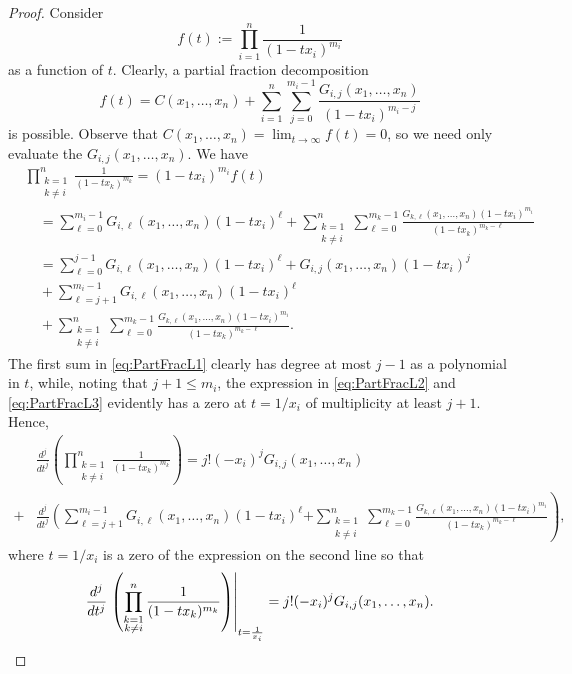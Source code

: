 \documentclass{amsart}
\theoremstyle{definition}
\theoremstyle{remark}
\begin{document}
\begin{proof}
Consider
\[
    f(t)    :=  \prod\limits_{i=1}^n \frac{1}{(1 - t x_i)^{m_i} }
\]
as a function of $t$. Clearly, a partial fraction decomposition
\[
    f(t)    =   C(x_1,\ldots,x_n)
                    + \sum\limits_{i=1}^n \sum\limits_{j=0}^{m_i-1}
                        \frac{ G_{i,j}(x_1,\ldots,x_n) }{(1 - t x_i)^{m_i - j} }
\]
is possible. Observe that $C(x_1,\ldots,x_n) = \lim_{t\to\infty} f(t) = 0$, so we need only evaluate the
$G_{i,j}(x_1,\ldots,x_n)$. We have
\begin{align}
    \nonumber
    &\prod\limits_{\substack{k=1 \\ k\neq i}}^n \frac{1}{(1 - t x_k)^{m_k}}
        =      (1 - t x_i)^{m_i} f(t)
    \\ \nonumber &\quad
    = \sum\limits_{\ell=0}^{m_i-1} G_{i,\ell}(x_1,\ldots,x_n)(1 - t x_i)^\ell
            + \sum\limits_{\substack{k=1 \\ k\neq i}}^n \sum\limits_{\ell=0}^{m_k-1}
                \frac{G_{k,\ell}(x_1,\ldots,x_n) (1 - t x_i)^{m_i}}
                    {(1 - t x_k)^{m_k-\ell}}
    \\ \label{eq:PartFracL1}
    &\quad=      \sum\limits_{\ell=0}^{j-1} G_{i,\ell}(x_1,\ldots,x_n)(1 - t x_i)^\ell
                + G_{i,j}(x_1,\ldots,x_n)(1 - t x_i)^j
    \\ \label{eq:PartFracL2}
    &\quad
                + \sum\limits_{\ell=j+1}^{m_i-1} G_{i,\ell}(x_1,\ldots,x_n)(1 - t x_i)^\ell
    \\ \label{eq:PartFracL3}
    &\quad
                + \sum\limits_{\substack{k=1\\k\neq i}}^n \sum\limits_{\ell=0}^{m_k-1}
                    \frac{G_{k,\ell}(x_1,\ldots,x_n) (1 - t x_i)^{m_i} }
                        {(1 - t x_k)^{m_k-\ell}}.
\end{align}
The first sum in \eqref{eq:PartFracL1} clearly has degree at most $j-1$ as a polynomial in $t$,
while, noting that $j+1 \leq m_i$, the expression in \eqref{eq:PartFracL2} and \eqref{eq:PartFracL3}
evidently has a zero at $t = 1/x_i$ of multiplicity at least $j+1$. Hence,
\begin{align*}
    & \frac{d^j}{dt^j}\left( \prod\limits_{\substack{k=1 \\ k\neq i}}^n \frac{1}{(1 - t x_k)^{m_k}} \right)
    =
    j!(-x_i)^j G_{i,j}(x_1,\ldots,x_n)
    \\
        + & \frac{d^j}{dt^j}\left( \sum\limits_{\ell=j+1}^{m_i-1} G_{i,\ell}(x_1,\ldots,x_n)(1 - t x_i)^\ell \right.
    \left.
                + \sum\limits_{\substack{k=1\\k\neq i}}^n \sum\limits_{\ell=0}^{m_k-1}
                    \frac{G_{k,\ell}(x_1,\ldots,x_n) (1 - t x_i)^{m_i} }
                        {(1 - t x_k)^{m_k-\ell}} \right),
\end{align*}
where $t = 1/x_i$ is a zero of the expression on the second line so that
\[
    \frac{d^j}{dt^j}\left.\left( \prod\limits_{\substack{k=1 \\ k\neq i}}^n \frac{1}{(1 - t x_k)^{m_k}} \right)
        \right|_{t = \frac{1}{x_i} }
    =
    j!(-x_i)^j G_{i,j}(x_1,\ldots,x_n).
    \qedhere
\]
\end{proof}
\end{document}
